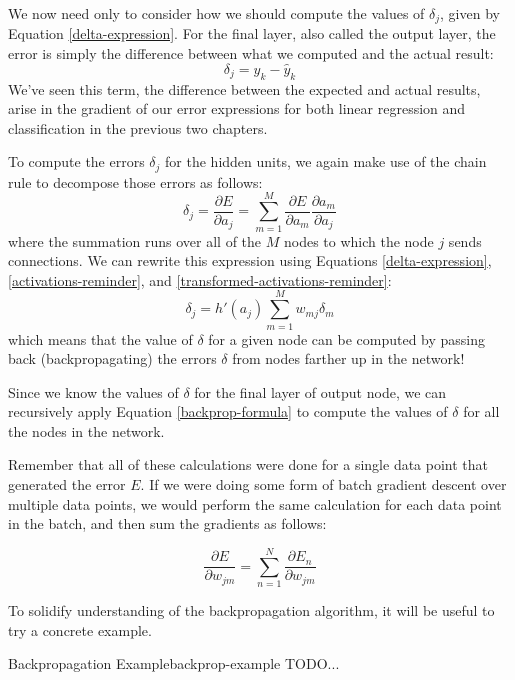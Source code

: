 We now need only to consider how we should compute the values of $\delta_{j}$, given by Equation \ref{delta-expression}.
For the final layer, also called the output layer, the error is simply the difference between what we computed and the actual result:
\begin{equation*}
	\delta_{j} = y_{k} - \hat{y}_{k}
\end{equation*}
We've seen this term, the difference between the expected and actual results, arise in the gradient of our error expressions for both linear regression and classification in the previous two chapters.

To compute the errors $\delta_{j}$ for the hidden units, we again make use of the chain rule to decompose those errors as follows:
\begin{equation} \label{backprop-for-deltas}
	\delta_{j} = \frac{\partial E}{\partial a_{j}} = \sum_{m=1}^{M} \frac{\partial E}{\partial a_{m}} \frac{\partial a_{m}}{\partial a_{j}} 
\end{equation}
where the summation runs over all of the $M$ nodes to which the node $j$ sends connections. We can rewrite this expression using Equations \ref{delta-expression}, \ref{activations-reminder}, and \ref{transformed-activations-reminder}:
\begin{equation} \label{backprop-formula}
	\delta_{j} = h'(a_{j}) \sum_{m=1}^{M} w_{mj} \delta_{m}
\end{equation}
which means that the value of $\delta$ for a given node can be computed by passing back (backpropagating) the errors $\delta$ from nodes farther up in the network!

Since we know the values of $\delta$ for the final layer of output node, we can recursively apply Equation \ref{backprop-formula} to compute the values of $\delta$ for all the nodes in the network.

Remember that all of these calculations were done for a single data point that generated the error $E$. If we were doing some form of batch gradient descent over multiple data points, we would perform the same calculation for each data point in the batch, and then sum the gradients as follows:

\begin{equation} \label{batch-errors-backprop}
	\frac{\partial E}{\partial w_{jm}} = \sum_{n=1}^{N} \frac{\partial E_{n}}{\partial w_{jm}}
\end{equation}

To solidify understanding of the backpropagation algorithm, it will be useful to try a concrete example.

\begin{example}{Backpropagation Example}{backprop-example}
	TODO...
\end{example}
